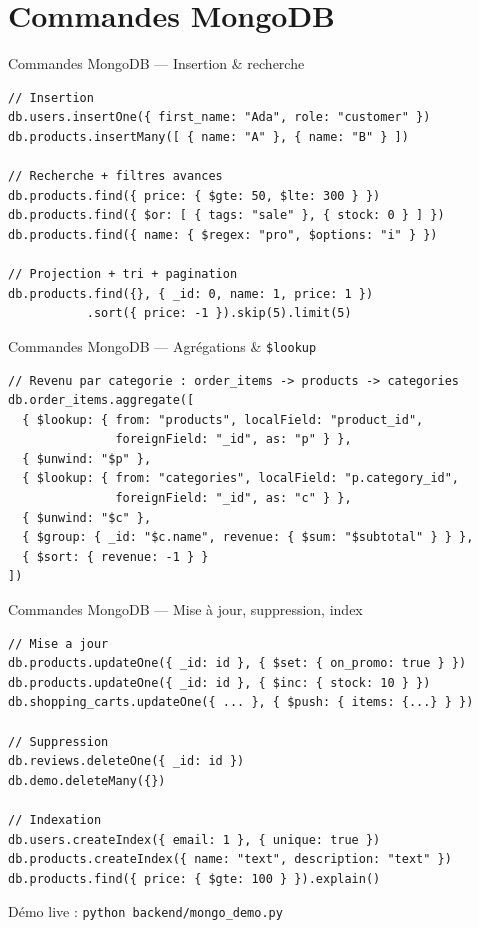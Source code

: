 \documentclass[aspectratio=169]{beamer}
\begin{document}
\section{Commandes MongoDB}
\begin{frame}[fragile]{Commandes MongoDB — Insertion \& recherche}
\begin{lstlisting}
// Insertion
db.users.insertOne({ first_name: "Ada", role: "customer" })
db.products.insertMany([ { name: "A" }, { name: "B" } ])

// Recherche + filtres avances
db.products.find({ price: { $gte: 50, $lte: 300 } })
db.products.find({ $or: [ { tags: "sale" }, { stock: 0 } ] })
db.products.find({ name: { $regex: "pro", $options: "i" } })

// Projection + tri + pagination
db.products.find({}, { _id: 0, name: 1, price: 1 })
           .sort({ price: -1 }).skip(5).limit(5)
\end{lstlisting}
\end{frame}

\begin{frame}[fragile]{Commandes MongoDB — Agrégations \& \texttt{\$lookup}}
\begin{lstlisting}
// Revenu par categorie : order_items -> products -> categories
db.order_items.aggregate([
  { $lookup: { from: "products", localField: "product_id",
               foreignField: "_id", as: "p" } },
  { $unwind: "$p" },
  { $lookup: { from: "categories", localField: "p.category_id",
               foreignField: "_id", as: "c" } },
  { $unwind: "$c" },
  { $group: { _id: "$c.name", revenue: { $sum: "$subtotal" } } },
  { $sort: { revenue: -1 } }
])
\end{lstlisting}
\end{frame}

\begin{frame}[fragile]{Commandes MongoDB — Mise à jour, suppression, index}
\begin{lstlisting}
// Mise a jour
db.products.updateOne({ _id: id }, { $set: { on_promo: true } })
db.products.updateOne({ _id: id }, { $inc: { stock: 10 } })
db.shopping_carts.updateOne({ ... }, { $push: { items: {...} } })

// Suppression
db.reviews.deleteOne({ _id: id })
db.demo.deleteMany({})

// Indexation
db.users.createIndex({ email: 1 }, { unique: true })
db.products.createIndex({ name: "text", description: "text" })
db.products.find({ price: { $gte: 100 } }).explain()
\end{lstlisting}
  \footnotesize Démo live : \texttt{python backend/mongo\_demo.py}
\end{frame}
\end{document}
